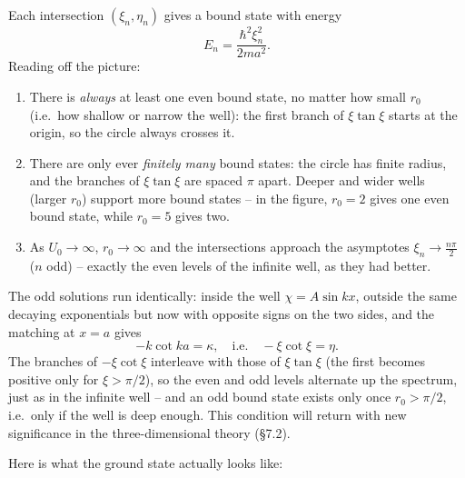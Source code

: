 Each intersection $(\xi_n, \eta_n)$ gives a bound state with energy
$$
E_n = \frac{\hbar^2 \xi_n^2}{2 m a^2}.
$$
Reading off the picture:
\begin{enumerate}[label=(\roman*)]
    \item There is \emph{always} at least one even bound state, no matter how small $r_0$ (i.e.\ how shallow or narrow the well): the first branch of $\xi \tan \xi$ starts at the origin, so the circle always crosses it.
    \item There are only ever \emph{finitely many} bound states: the circle has finite radius, and the branches of $\xi \tan \xi$ are spaced $\pi$ apart. Deeper and wider wells (larger $r_0$) support more bound states -- in the figure, $r_0 = 2$ gives one even bound state, while $r_0 = 5$ gives two.
    \item As $U_0 \rightarrow \infty$, $r_0 \rightarrow \infty$ and the intersections approach the asymptotes $\xi_n \rightarrow \frac{n\pi}{2}$ ($n$ odd) -- exactly the even levels of the infinite well, as they had better.
\end{enumerate}
The odd solutions run identically: inside the well $\chi = A \sin kx$, outside the same decaying exponentials but now with opposite signs on the two sides, and the matching at $x = a$ gives
$$
-k \cot ka = \kappa, \quad \text{i.e.} \quad -\xi \cot \xi = \eta.
$$
The branches of $-\xi\cot\xi$ interleave with those of $\xi \tan \xi$ (the first becomes positive only for $\xi > \pi/2$), so the even and odd levels alternate up the spectrum, just as in the infinite well -- and an odd bound state exists only once $r_0 > \pi/2$, i.e.\ only if the well is deep enough. This condition will return with new significance in the three-dimensional theory (\S 7.2).

Here is what the ground state actually looks like:

